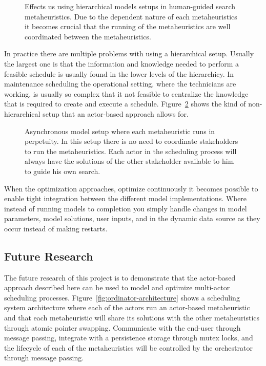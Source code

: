 \begin{figure}[H]
	
	\label{fig:discussion:hierarchical_model_setup}
	\caption{Effects us using hierarchical models setups in human-guided search metaheuristics.
	Due to the dependent nature of each metaheuristics it becomes crucial that the running of 
	the metaheuristics are well coordinated between the metaheuristics.}
\end{figure}

In practice there are multiple problems with using a hierarchical setup.
Usually the largest one is that the information and knowledge needed to 
perform a feasible schedule is usually found in the lower levels of the 
hierarchicy. In maintenance scheduling the operational setting, where the
technicians are working, is usually so complex that it not feasible to 
centralize the knowledge that is required to create and execute a 
schedule. Figure~\ref{fig:discussion:asynchronous_setup}
shows the kind of non-hierarchical setup that an actor-based approach 
allows for.

\begin{figure}[H]
	
	\caption{Asynchronous model setup where each metaheuristic runs in perpetuity. In this setup
	there is no need to coordinate stakeholders to run the metaheuristics. Each actor in the 
	scheduling process will always have the solutions of the other stakeholder available to 
	him to guide his own search.}
	\label{fig:discussion:asynchronous_setup}
\end{figure}

When the optimization approaches, optimize continuously it becomes possible
to enable tight integration between the different model implementations. Where 
instead of running models to completion you simply handle changes in model 
parameters, model solutions, user inputs, and in the dynamic data source as 
they occur instead of making restarts.

\subsection{Future Research}
\label{sec:discussion:future_research}
The future research of this project is to demonstrate that
the actor-based approach described here can be used to model and optimize 
multi-actor scheduling processes. 
Figure~\ref{fig:ordinator-architecture}
shows a scheduling system architecture where each of the actors run an actor-based metaheuristic
and that each metaheuristic will share its solutions with the other
metaheuristics through atomic pointer swapping. Communicate with the end-user
through message passing, integrate with a persistence storage through mutex
locks, and the lifecycle of each of the metaheuristics will be controlled by
the orchestrator through message passing.

